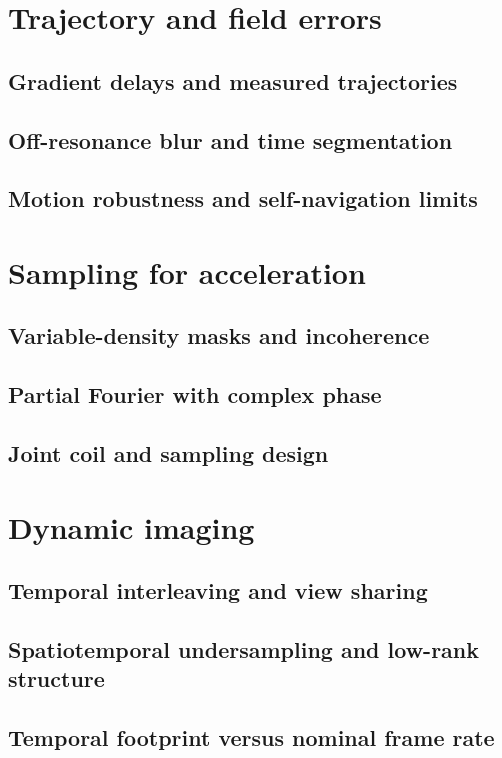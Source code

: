 \section{Trajectory and field errors}
\label{sec:15:trajectory-and-field-errors}
\subsection{Gradient delays and measured trajectories}
\subsection{Off-resonance blur and time segmentation}
\subsection{Motion robustness and self-navigation limits}

\section{Sampling for acceleration}
\label{sec:15:sampling-for-acceleration}
\subsection{Variable-density masks and incoherence}
\subsection{Partial Fourier with complex phase}
\subsection{Joint coil and sampling design}

\section{Dynamic imaging}
\label{sec:15:dynamic-imaging}
\subsection{Temporal interleaving and view sharing}
\subsection{Spatiotemporal undersampling and low-rank structure}
\subsection{Temporal footprint versus nominal frame rate}

